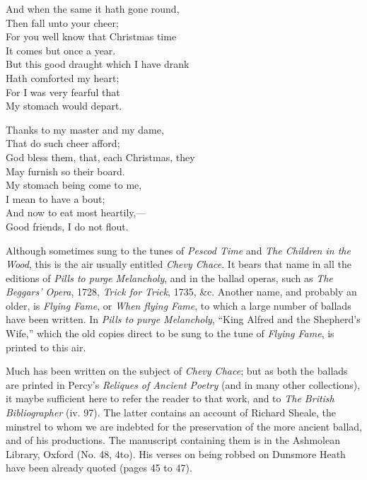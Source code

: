 \begin{dcverse}
\begin{altverse}
And when the same it hath gone round,\\
Then fall unto your cheer;\\
For you well know that Christmas time\\
It comes but once a year.\\
But this good draught which I have drank\\
Hath comforted my heart;\\
For I was very fearful that\\
My stomach would depart.
\end{altverse}

\begin{altverse}
Thanks to my master and my dame,\\
That do such cheer afford;\\
God bless them, that, each Christmas, they\\
May furnish so their board.\\
My stomach being come to me,\\
I mean to have a bout;\\
And now to eat most heartily,—\\
Good friends, I do not flout.
\end{altverse}
\end{dcverse}

\pagebreak





Although sometimes sung to the tunes of \textit{Pescod Time} and \textit{The Children in the
Wood}, this is the air usually entitled \textit{Chevy Chace}. It bears that name in all the
editions of \textit{Pills to purge Melancholy}, and in the ballad operas, such as \textit{The
Beggars' Opera}, 1728, \textit{Trick for Trick}, 1735, \&c. Another name, and probably
an older, is \textit{Flying Fame}, or \textit{When flying Fame}, to which a large number of
ballads have been written. In \textit{Pills to purge Melancholy}, “King Alfred and the
Shepherd’s Wife,” which the old copies direct to be sung to the tune of \textit{Flying
Fame}, is printed to this air.

Much has been written on the subject of \textit{Chevy Chace}; but as both the ballads
are printed in Percy’s \textit{Reliques of Ancient Poetry} (and in many other collections), 
it maybe sufficient here to refer the reader to that work, and to \textit{The
British Bibliographer} (iv. 97). The latter contains an account of Richard Sheale,
the minstrel to whom we are indebted for the preservation of the more ancient
ballad, and of his productions. The manuscript containing them is in the Ashmolean
Library, Oxford (No. 48, 4to). His verses on being robbed on Dunsmore
Heath have been already quoted (pages 45 to 47).

